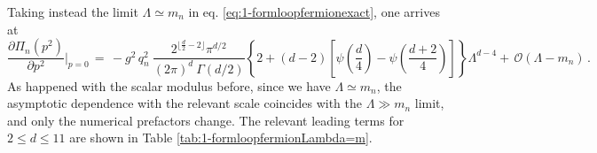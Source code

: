 Taking instead the limit $\Lambda \simeq m_n$ in eq. \eqref{eq:1-formloopfermionexact}, one arrives at
%
\begin{equation}
			\frac {\partial \Pi_n(p^2)}{\partial p^2} \bigg\rvert_{p=0} \, = \, - g^2\, q_n^2 \ \frac{2^{\lfloor\frac{d}{2}-2 \rfloor}  \pi^{d/2}}{ (2 \pi)^d\ \Gamma(d/2) }   \left\{ 2+(d-2)\left[\psi\left( \frac{d}{4}\right)-  \psi\left( \frac{d+2}{4} \right)  \right] \right\} \Lambda^{d-4} + \, \mathcal{O}(\Lambda-m_n)\, .
\label{eq:1-formloopfermionLambda=m}
\end{equation}
%
As happened with the scalar modulus before, since we have $\Lambda\simeq m_n$, the asymptotic dependence with the relevant scale coincides with the $\Lambda \gg m_n$ limit, and only the numerical prefactors change. The relevant leading terms for $2\leq d \leq 11$ are shown in Table \ref{tab:1-formloopfermionLambda=m}.
%
%

